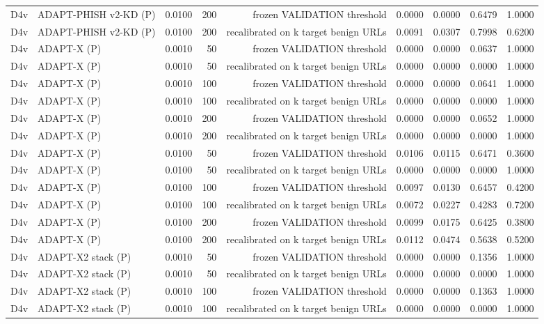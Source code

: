 \begin{table}[t]
\begin{tabular}{llrrrrrrr}
D4v & ADAPT-PHISH v2-KD (P) & 0.0100 & 200 & frozen VALIDATION threshold & 0.0000 & 0.0000 & 0.6479 & 1.0000 \\
D4v & ADAPT-PHISH v2-KD (P) & 0.0100 & 200 & recalibrated on k target benign URLs & 0.0091 & 0.0307 & 0.7998 & 0.6200 \\
D4v & ADAPT-X (P) & 0.0010 & 50 & frozen VALIDATION threshold & 0.0000 & 0.0000 & 0.0637 & 1.0000 \\
D4v & ADAPT-X (P) & 0.0010 & 50 & recalibrated on k target benign URLs & 0.0000 & 0.0000 & 0.0000 & 1.0000 \\
D4v & ADAPT-X (P) & 0.0010 & 100 & frozen VALIDATION threshold & 0.0000 & 0.0000 & 0.0641 & 1.0000 \\
D4v & ADAPT-X (P) & 0.0010 & 100 & recalibrated on k target benign URLs & 0.0000 & 0.0000 & 0.0000 & 1.0000 \\
D4v & ADAPT-X (P) & 0.0010 & 200 & frozen VALIDATION threshold & 0.0000 & 0.0000 & 0.0652 & 1.0000 \\
D4v & ADAPT-X (P) & 0.0010 & 200 & recalibrated on k target benign URLs & 0.0000 & 0.0000 & 0.0000 & 1.0000 \\
D4v & ADAPT-X (P) & 0.0100 & 50 & frozen VALIDATION threshold & 0.0106 & 0.0115 & 0.6471 & 0.3600 \\
D4v & ADAPT-X (P) & 0.0100 & 50 & recalibrated on k target benign URLs & 0.0000 & 0.0000 & 0.0000 & 1.0000 \\
D4v & ADAPT-X (P) & 0.0100 & 100 & frozen VALIDATION threshold & 0.0097 & 0.0130 & 0.6457 & 0.4200 \\
D4v & ADAPT-X (P) & 0.0100 & 100 & recalibrated on k target benign URLs & 0.0072 & 0.0227 & 0.4283 & 0.7200 \\
D4v & ADAPT-X (P) & 0.0100 & 200 & frozen VALIDATION threshold & 0.0099 & 0.0175 & 0.6425 & 0.3800 \\
D4v & ADAPT-X (P) & 0.0100 & 200 & recalibrated on k target benign URLs & 0.0112 & 0.0474 & 0.5638 & 0.5200 \\
D4v & ADAPT-X2 stack (P) & 0.0010 & 50 & frozen VALIDATION threshold & 0.0000 & 0.0000 & 0.1356 & 1.0000 \\
D4v & ADAPT-X2 stack (P) & 0.0010 & 50 & recalibrated on k target benign URLs & 0.0000 & 0.0000 & 0.0000 & 1.0000 \\
D4v & ADAPT-X2 stack (P) & 0.0010 & 100 & frozen VALIDATION threshold & 0.0000 & 0.0000 & 0.1363 & 1.0000 \\
D4v & ADAPT-X2 stack (P) & 0.0010 & 100 & recalibrated on k target benign URLs & 0.0000 & 0.0000 & 0.0000 & 1.0000 \\

\end{tabular}
\end{table}
